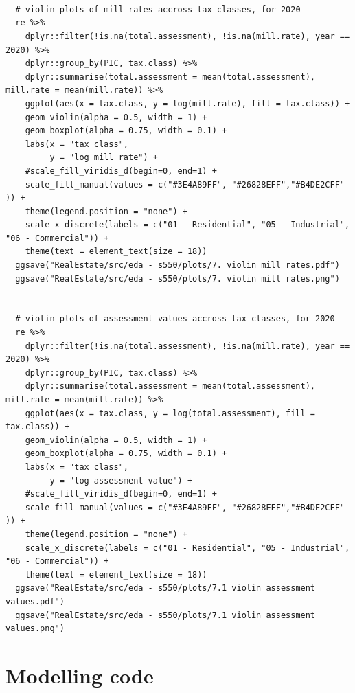 \documentclass{article}
\begin{document}
\begin{lstlisting}[style=R, caption={Code used for the exploratory data analysis.}, captionpos=b]
  
  
  
  # violin plots of mill rates accross tax classes, for 2020
  re %>%  
    dplyr::filter(!is.na(total.assessment), !is.na(mill.rate), year == 2020) %>% 
    dplyr::group_by(PIC, tax.class) %>% 
    dplyr::summarise(total.assessment = mean(total.assessment), mill.rate = mean(mill.rate)) %>% 
    ggplot(aes(x = tax.class, y = log(mill.rate), fill = tax.class)) +
    geom_violin(alpha = 0.5, width = 1) +
    geom_boxplot(alpha = 0.75, width = 0.1) +
    labs(x = "tax class",
         y = "log mill rate") +
    #scale_fill_viridis_d(begin=0, end=1) +
    scale_fill_manual(values = c("#3E4A89FF", "#26828EFF","#B4DE2CFF" )) +
    theme(legend.position = "none") +
    scale_x_discrete(labels = c("01 - Residential", "05 - Industrial", "06 - Commercial")) +
    theme(text = element_text(size = 18))
  ggsave("RealEstate/src/eda - s550/plots/7. violin mill rates.pdf")
  ggsave("RealEstate/src/eda - s550/plots/7. violin mill rates.png")
  
  
  # violin plots of assessment values accross tax classes, for 2020
  re %>%  
    dplyr::filter(!is.na(total.assessment), !is.na(mill.rate), year == 2020) %>% 
    dplyr::group_by(PIC, tax.class) %>% 
    dplyr::summarise(total.assessment = mean(total.assessment), mill.rate = mean(mill.rate)) %>% 
    ggplot(aes(x = tax.class, y = log(total.assessment), fill = tax.class)) +
    geom_violin(alpha = 0.5, width = 1) +
    geom_boxplot(alpha = 0.75, width = 0.1) +
    labs(x = "tax class",
         y = "log assessment value") +
    #scale_fill_viridis_d(begin=0, end=1) +
    scale_fill_manual(values = c("#3E4A89FF", "#26828EFF","#B4DE2CFF" )) +
    theme(legend.position = "none") +
    scale_x_discrete(labels = c("01 - Residential", "05 - Industrial", "06 - Commercial")) +
    theme(text = element_text(size = 18))
  ggsave("RealEstate/src/eda - s550/plots/7.1 violin assessment values.pdf")
  ggsave("RealEstate/src/eda - s550/plots/7.1 violin assessment values.png")
\end{lstlisting}

\section{Modelling code}
\end{document}
